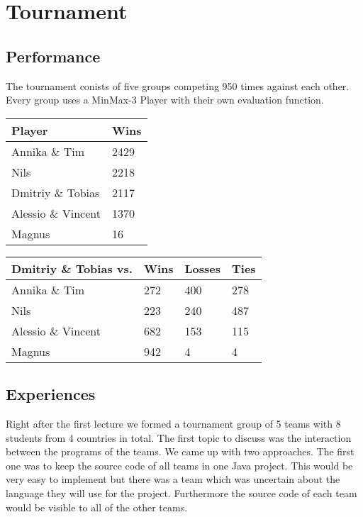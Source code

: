 \chapter{Tournament}
\label{ch:tournament}
\section{Performance}
The tournament conists of five groups competing 950 times against each other. Every group uses a MinMax-3 Player with their own evaluation function.
\begin{table}[h]
	\centering
	\begin{tabular}[h]{l|l}
		\textbf{Player} & \textbf{Wins}\\
		\hline
		Annika \& Tim & 2429 \\
		Nils & 2218 \\
		Dmitriy \& Tobias & 2117 \\
		Alessio \& Vincent & 1370 \\
		Magnus & 16 \\
	\end{tabular}
\end{table}
\begin{table}[h]
	\centering
	\begin{tabular}[h]{l|l|l|l}
		\textbf{Dmitriy \& Tobias vs.} & \textbf{Wins} & \textbf{Losses} & \textbf{Ties}\\
		\hline
		Annika \& Tim & 272 & 400 & 278\\
		Nils & 223 & 240 & 487\\
		Alessio \& Vincent & 682 & 153 & 115\\
		Magnus & 942 & 4 & 4\\
	\end{tabular}
\end{table}
\pagebreak
\section{Experiences}
Right after the first lecture we formed a tournament group of 5 teams with 8 students from 4 countries in total. The first topic to discuss was the interaction between the programs of the teams. We came up with two approaches. The first one was to keep the source code of all teams in one Java project. This would be very easy to implement but there was a team which was uncertain about the language they will use for the project. Furthermore the source code of each team would be visible to all of the other teams.

